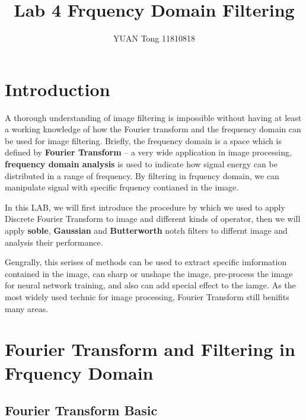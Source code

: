 \documentclass[
	12pt, %
]{style/fphw}
\title{Lab 4 Frquency Domain Filtering} %
\author{YUAN Tong 11810818} %
\institute{Southern University of Science and Technology \\ School of Microelectronic} %
\begin{document}
\maketitle %


\section*{Introduction}

A thorough understanding of image filtering is impossible without having at least a working knowledge of how the Fourier transform and the frequency domain can be used for image filtering. Briefly, the frequency domain is a space which is defined by \textbf{Fourier Transform} -- a very wide application in image processing, \textbf{frequency domain analysis} is used to indicate how signal energy can be distributed in a range of frequency. By filtering in frquency domain, we can manipulate signal with specific frquency contianed in the image.

In this LAB, we will first introduce the procedure by which we used to apply Discrete Fourier Transform to image and different kinds of operator, then we will apply \textbf{soble}, \textbf{Gaussian} and \textbf{Butterworth} notch filters to differnt image and analysis their performance.

Gengrally, this serises of methods can be used to extract specific imformation contained in the image, can sharp or unshape the image, pre-process the image for neural network training, and also can add special effect to the iamge. As the most widely used technic for image processing, Fourier Transform still benifits many areas.

\newpage

\section*{Fourier Transform and Filtering in Frquency Domain}

\subsection*{Fourier Transform Basic} \
\end{document}
